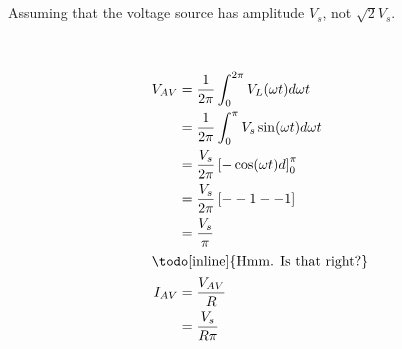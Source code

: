 \subsection{}\label{sec:1a}

Assuming that the voltage source has amplitude $V_s$, not $\sqrt{2}V_s$.

\begin{center}


       
    \vspace{2cm} \\
       
\end{center}

\begin{align*}
V_{AV} & = \frac{1}{2\pi} \int_0^{2\pi} V_L(\omega{}t) d \omega t \\
       & = \frac{1}{2\pi} \int_0^{\pi} V_s\sin(\omega{}t) d \omega t \\
       & = \frac{V_s}{2\pi} \left[ -\cos(\omega{}t) d \right]_0^{\pi} \\   
       & = \frac{V_s}{2\pi} \left[ --1 --1 \right] \\   
       & = \frac{V_s}{\pi} \\
\intertext{\todo[inline]{Hmm. Is that right?}}
I_{AV} & = \frac{V_{AV}}{R} \\
       & = \frac{V_s}{R\pi}
\end{align*}

